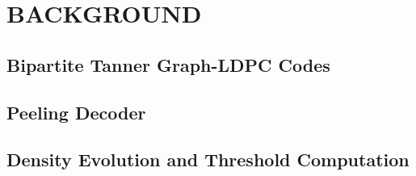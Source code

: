 \chapter{BACKGROUND}
\label{chap:background}

\section{Bipartite Tanner Graph-LDPC Codes}

\section{Peeling Decoder}

\section{Density Evolution and Threshold Computation}